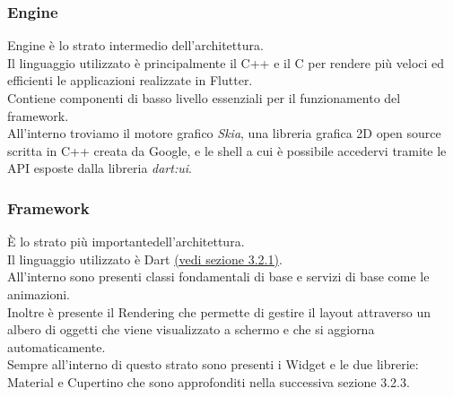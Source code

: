 \subsubsection{Engine}
Engine è lo strato intermedio dell'architettura.\\
Il linguaggio utilizzato è principalmente il C++ e il C per rendere più veloci ed efficienti le applicazioni realizzate in Flutter.\\
Contiene componenti di basso livello essenziali per il funzionamento del framework.\\
All'interno troviamo il motore grafico \textit{Skia}, una libreria grafica 2D open source scritta in C++ creata da Google, e le shell a cui è possibile accedervi tramite le API esposte dalla libreria \textit{dart:ui}.

\subsubsection{Framework}
È lo strato più importantedell'architettura.\\
Il linguaggio utilizzato è Dart \hyperref[sec:Dart]{(vedi sezione 3.2.1)}.\\
All'interno sono presenti classi fondamentali di base e servizi di base come le animazioni.\\
Inoltre è presente il Rendering che permette di gestire il layout attraverso un albero di oggetti che viene visualizzato
a schermo e che si aggiorna automaticamente.\\
Sempre all'interno di questo strato sono presenti i Widget e le due librerie: Material e Cupertino che sono approfonditi nella successiva sezione 3.2.3.

\newpage

